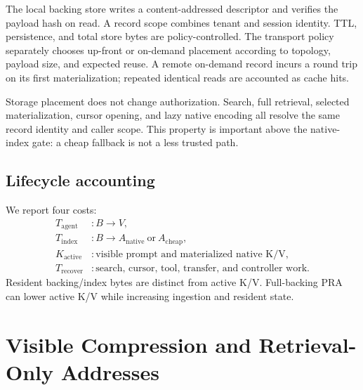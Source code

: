\documentclass[11pt]{article}
\begin{document}
The local backing store writes a content-addressed descriptor and verifies the
payload hash on read. A record scope combines tenant and session identity.
TTL, persistence, and total store bytes are policy-controlled. The transport
policy separately chooses up-front or on-demand placement according to
topology, payload size, and expected reuse. A remote on-demand record incurs a
round trip on its first materialization; repeated identical reads are accounted
as cache hits.

Storage placement does not change authorization. Search, full retrieval,
selected materialization, cursor opening, and lazy native encoding all resolve
the same record identity and caller scope. This property is important above the
native-index gate: a cheap fallback is not a less trusted path.

\subsection{Lifecycle accounting}

We report four costs:
\begin{align}
T_{\mathrm{agent}} &: B \rightarrow V,\\
T_{\mathrm{index}} &: B \rightarrow A_{\mathrm{native}}\ \text{or}\ A_{\mathrm{cheap}},\\
K_{\mathrm{active}} &: \text{visible prompt and materialized native K/V},\\
T_{\mathrm{recover}} &: \text{search, cursor, tool, transfer, and controller work}.
\end{align}
Resident backing/index bytes are distinct from active K/V. Full-backing PRA can
lower active K/V while increasing ingestion and resident state.

\section{Visible Compression and Retrieval-Only Addresses}
\end{document}
